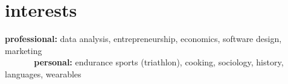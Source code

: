 \documentclass[]{friggeri-cv} %
\begin{document}

\section{interests}

\textbf{professional:} data analysis, entrepreneurship, economics, software design, marketing \\
\textbf{\ \ \ \ \ \ personal:} endurance sports (triathlon), cooking, sociology, history, languages, wearables









\end{document}
